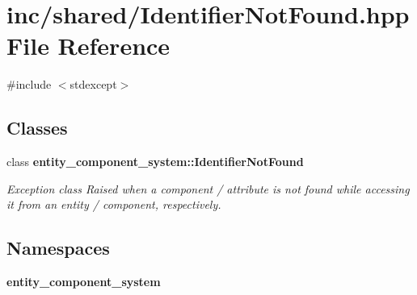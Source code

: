 \section{inc/shared/\+Identifier\+Not\+Found.hpp File Reference}
\label{_identifier_not_found_8hpp}
{\ttfamily \#include $<$stdexcept$>$}\newline
\subsection*{Classes}
\begin{DoxyCompactItemize}
\item 
class {\bf entity\+\_\+component\+\_\+system\+::\+Identifier\+Not\+Found}
\begin{DoxyCompactList}\small\item\em Exception class Raised when a component / attribute is not found while accessing it from an entity / component, respectively. \end{DoxyCompactList}\end{DoxyCompactItemize}
\subsection*{Namespaces}
\begin{DoxyCompactItemize}
\item 
 {\bf entity\+\_\+component\+\_\+system}
\end{DoxyCompactItemize}
